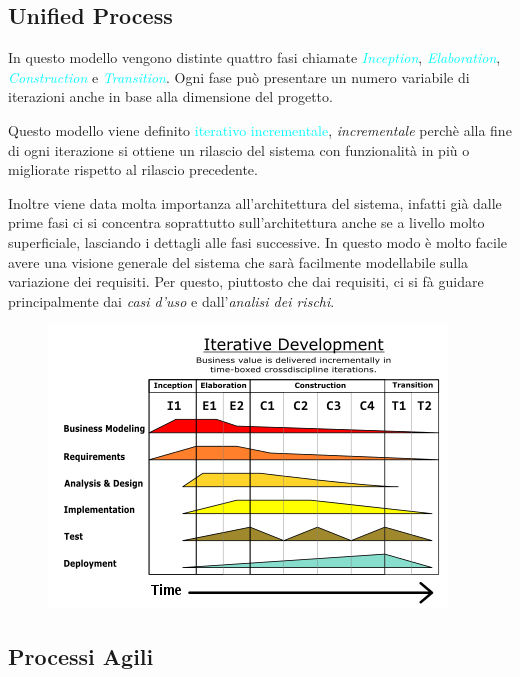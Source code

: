 \subsection{Unified Process}

In questo modello vengono distinte quattro fasi chiamate \emph{\textcolor{cyan}{Inception}}, \emph{\textcolor{cyan}{Elaboration}}, \emph{\textcolor{cyan}{Construction}}
e \emph{\textcolor{cyan}{Transition}}. Ogni fase può presentare un numero variabile di iterazioni anche in base alla dimensione
del progetto.

Questo modello viene definito \textcolor{cyan}{iterativo incrementale}, \emph{incrementale} perchè
alla fine di ogni iterazione si ottiene un rilascio del sistema con funzionalità in più o migliorate
rispetto al rilascio precedente.

Inoltre viene data molta importanza all'architettura del sistema, infatti già dalle prime fasi ci si
concentra soprattutto sull'architettura anche se a livello molto superficiale, lasciando i dettagli alle fasi successive. In questo
modo è molto facile avere una visione generale del sistema che sarà facilmente modellabile sulla variazione dei requisiti. Per
questo, piuttosto che dai requisiti, ci si fà guidare principalmente dai \emph{casi d'uso} e dall'\emph{analisi dei rischi}.

\begin{figure}[h]
    \begin{center}
        \includegraphics[scale=0.8]{img/unified_process.png}
    \end{center}
\end{figure}

\subsection{Processi Agili}
